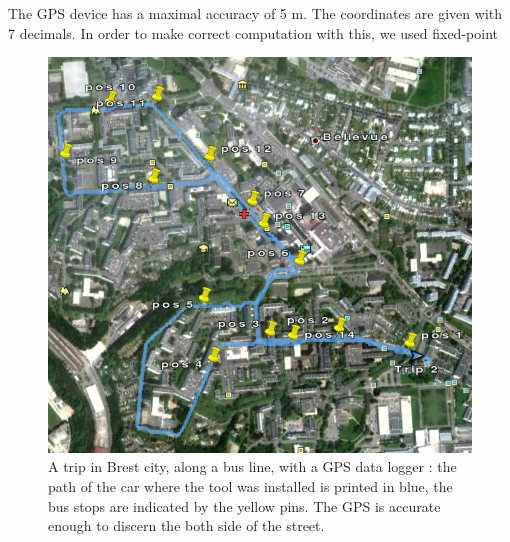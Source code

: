 The GPS device has a maximal accuracy of 5 m. The coordinates are given with 7 decimals. 
In order to make correct computation with this, we used fixed-point 

\begin{figure}
\begin{center}
\includegraphics[width=12cm]{trip2.png}
\caption{A trip in Brest city, along a bus line, with a GPS data logger : 
the path of the car where the tool was installed is printed in blue, 
the bus stops are indicated by the yellow pins.
The GPS is accurate enough to discern the both side of the street.}
\label{fig:mapAccessOSM}
\end{center}
\end{figure}

